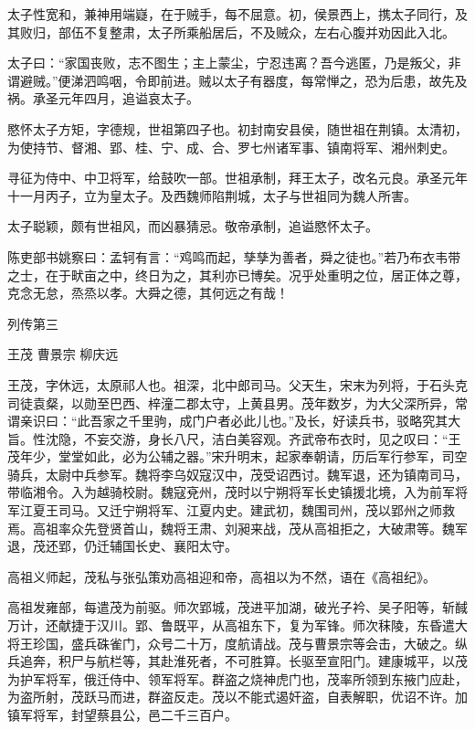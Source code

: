 \documentclass[12pt,UTF8]{ctexbook}
\begin{document}
太子性宽和，兼神用端嶷，在于贼手，每不屈意。初，侯景西上，携太子同行，及其败归，部伍不复整肃，太子所乘船居后，不及贼众，左右心腹并劝因此入北。

太子曰：“家国丧败，志不图生；主上蒙尘，宁忍违离？吾今逃匿，乃是叛父，非谓避贼。”便涕泗鸣咽，令即前进。贼以太子有器度，每常惮之，恐为后患，故先及祸。承圣元年四月，追谥哀太子。

愍怀太子方矩，字德规，世祖第四子也。初封南安县侯，随世祖在荆镇。太清初，为使持节、督湘、郢、桂、宁、成、合、罗七州诸军事、镇南将军、湘州刺史。

寻征为侍中、中卫将军，给鼓吹一部。世祖承制，拜王太子，改名元良。承圣元年十一月丙子，立为皇太子。及西魏师陷荆城，太子与世祖同为魏人所害。

太子聪颖，颇有世祖风，而凶暴猜忌。敬帝承制，追谥愍怀太子。

陈吏部书姚察曰：孟轲有言：“鸡鸣而起，孳孳为善者，舜之徒也。”若乃布衣韦带之士，在于畎亩之中，终日为之，其利亦已博矣。况乎处重明之位，居正体之尊，克念无怠，烝烝以孝。大舜之德，其何远之有哉！





列传第三

王茂 曹景宗 柳庆远

王茂，字休远，太原祁人也。祖深，北中郎司马。父天生，宋末为列将，于石头克司徒袁粲，以勋至巴西、梓潼二郡太守，上黄县男。茂年数岁，为大父深所异，常谓亲识曰：“此吾家之千里驹，成门户者必此儿也。”及长，好读兵书，驳略究其大旨。性沈隐，不妄交游，身长八尺，洁白美容观。齐武帝布衣时，见之叹曰：“王茂年少，堂堂如此，必为公辅之器。”宋升明末，起家奉朝请，历后军行参军，司空骑兵，太尉中兵参军。魏将李乌奴寇汉中，茂受诏西讨。魏军退，还为镇南司马，带临湘令。入为越骑校尉。魏寇兗州，茂时以宁朔将军长史镇援北境，入为前军将军江夏王司马。又迁宁朔将军、江夏内史。建武初，魏围司州，茂以郢州之师救焉。高祖率众先登贤首山，魏将王肃、刘昶来战，茂从高祖拒之，大破肃等。魏军退，茂还郢，仍迁辅国长史、襄阳太守。

高祖义师起，茂私与张弘策劝高祖迎和帝，高祖以为不然，语在《高祖纪》。

高祖发雍部，每遣茂为前驱。师次郢城，茂进平加湖，破光子衿、吴子阳等，斩馘万计，还献捷于汉川。郢、鲁既平，从高祖东下，复为军锋。师次秣陵，东昏遣大将王珍国，盛兵硃雀门，众号二十万，度航请战。茂与曹景宗等会击，大破之。纵兵追奔，积尸与航栏等，其赴淮死者，不可胜算。长驱至宣阳门。建康城平，以茂为护军将军，俄迁侍中、领军将军。群盗之烧神虎门也，茂率所领到东掖门应赴，为盗所射，茂跃马而进，群盗反走。茂以不能式遏奸盗，自表解职，优诏不许。加镇军将军，封望蔡县公，邑二千三百户。
\end{document}
